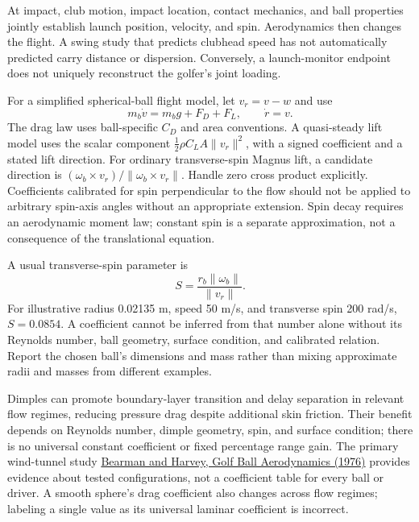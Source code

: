 At impact, club motion, impact location, contact mechanics, and ball properties
jointly establish launch position, velocity, and spin. Aerodynamics then changes
the flight. A swing study that predicts clubhead speed has not automatically
predicted carry distance or dispersion. Conversely, a launch-monitor endpoint
does not uniquely reconstruct the golfer's joint loading.

For a simplified spherical-ball flight model, let $v_r=v-w$ and use
\begin{equation}
 m_b\dot v=m_bg+F_D+F_L,\qquad \dot r=v.
 \label{eq:ball-trajectory}
\end{equation}
The drag law uses ball-specific $C_D$ and area conventions. A quasi-steady lift
model uses the scalar component $\tfrac12\rho C_LA\|v_r\|^2$, with a signed
coefficient and a stated lift direction. For ordinary transverse-spin Magnus
lift, a candidate direction is
$(\omega_b\times v_r)/\|\omega_b\times v_r\|$. Handle zero cross product
explicitly. Coefficients calibrated for spin perpendicular to the flow should
not be applied to arbitrary spin-axis angles without an appropriate extension.
Spin decay requires an aerodynamic moment law; constant spin is a separate
approximation, not a consequence of the translational equation.

A usual transverse-spin parameter is
\begin{equation}
 S=\frac{r_b\|\omega_b\|}{\|v_r\|}.
 \label{eq:spin-parameter}
\end{equation}
For illustrative radius 0.02135 m, speed 50 m/s, and transverse spin 200 rad/s,
$S=0.0854$. A coefficient cannot be inferred from that number alone without
its Reynolds number, ball geometry, surface condition, and calibrated relation.
Report the chosen ball's dimensions and mass rather than mixing approximate
radii and masses from different examples.

Dimples can promote boundary-layer transition and delay separation in relevant
flow regimes, reducing pressure drag despite additional skin friction. Their
benefit depends on Reynolds number, dimple geometry, spin, and surface condition;
there is no universal constant coefficient or fixed percentage range gain.
The primary wind-tunnel study
\href{https://doi.org/10.1017/S0001925900007617}{Bearman and Harvey, Golf Ball Aerodynamics (1976)}
provides evidence about tested configurations, not a coefficient table for every
ball or driver. A smooth sphere's drag coefficient also changes across flow
regimes; labeling a single value as its universal laminar coefficient is
incorrect.


